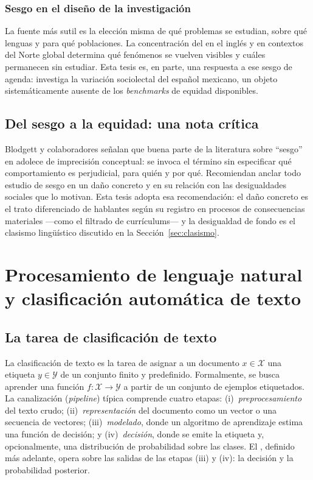 \subsubsection{Sesgo en el diseño de la investigación}

La fuente más sutil es la elección misma de qué problemas se estudian, sobre qué
lenguas y para qué poblaciones. La concentración del \PLN en el inglés y en
contextos del Norte global determina qué fenómenos se vuelven visibles y cuáles
permanecen sin estudiar. Esta tesis es, en parte, una respuesta a ese sesgo de
agenda: investiga la variación sociolectal del español mexicano, un objeto
sistemáticamente ausente de los \emph{benchmarks} de equidad disponibles.

\subsection{Del sesgo a la equidad: una nota crítica}
\label{sec:critica-bias}

Blodgett y colaboradores \cite{Blodgett2020Survey} señalan que buena parte de la
literatura sobre ``sesgo'' en \PLN adolece de imprecisión conceptual: se invoca
el término sin especificar qué comportamiento es perjudicial, para quién y por
qué. Recomiendan anclar todo estudio de sesgo en un daño concreto y en su
relación con las desigualdades sociales que lo motivan. Esta tesis adopta esa
recomendación: el daño concreto es el trato diferenciado de hablantes según su
registro en procesos de consecuencias materiales ---como el filtrado de
currículums--- y la desigualdad de fondo es el clasismo lingüístico discutido
en la Sección~\ref{sec:clasismo}.

\section{Procesamiento de lenguaje natural y clasificación automática de texto}
\label{sec:pln}

\subsection{La tarea de clasificación de texto}
\label{sec:tarea-clasificacion}

La clasificación de texto es la tarea de asignar a un documento $x \in
\mathcal{X}$ una etiqueta $y \in \mathcal{Y}$ de un conjunto finito y
predefinido. Formalmente, se busca aprender una función $f : \mathcal{X} \to
\mathcal{Y}$ a partir de un conjunto de ejemplos etiquetados. La canalización
(\emph{pipeline}) típica comprende cuatro etapas: (i)~\emph{preprocesamiento}
del texto crudo; (ii)~\emph{representación} del documento como un vector o una
secuencia de vectores; (iii)~\emph{modelado}, donde un algoritmo de aprendizaje
estima una función de decisión; y (iv)~\emph{decisión}, donde se emite la
etiqueta y, opcionalmente, una distribución de probabilidad sobre las clases.
El \INS, definido más adelante, opera sobre las salidas de las etapas (iii) y
(iv): la decisión y la probabilidad posterior.

